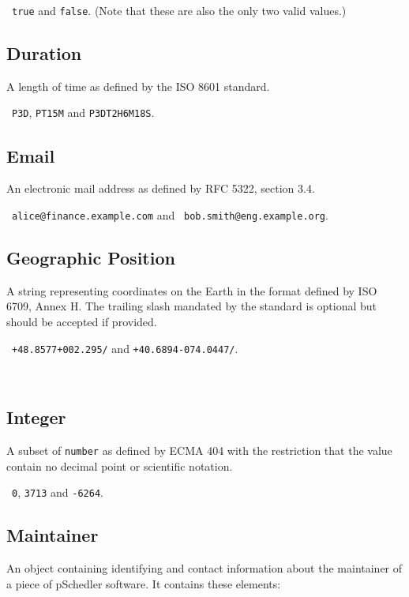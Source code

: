 \documentclass[10pt]{article}
\begin{document}
\example\ {\tt true} and {\tt false}.  (Note that these are also
the only two valid values.)


\subsection{Duration}
A length of time as defined by the ISO 8601 standard.

\example\ {\tt P3D}, {\tt PT15M} and {\tt P3DT2H6M18S}.


\subsection{Email}
An electronic mail address as defined by RFC 5322, section 3.4.

\example\ {\tt alice@finance.example.com} and {\tt
  bob.smith@eng.example.org}.



\subsection{Geographic Position}
A string representing coordinates on the Earth in the format defined
by ISO 6709, Annex H.  The trailing slash mandated by the standard is
optional but should be accepted if provided.

\example\ {\tt +48.8577+002.295/} and {\tt +40.6894-074.0447/}.

\\



\subsection{Integer}
A subset of {\tt number} as defined by ECMA 404 with the restriction
that the value contain no decimal point or scientific notation.

\example\ {\tt 0}, {\tt 3713} and {\tt -6264}.


\subsection{Maintainer}

An object containing identifying and contact information about the
maintainer of a piece of pSchedler software.  It contains these
elements:
\end{document}
